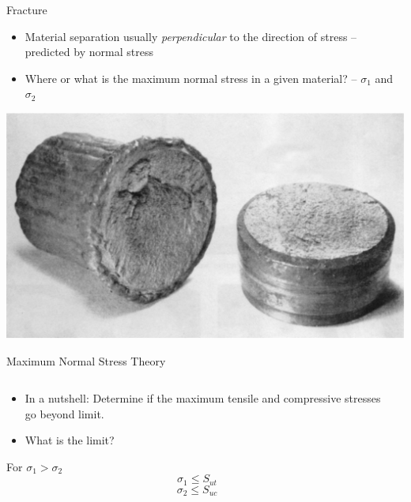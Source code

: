 \documentclass[10pt, svgnames]{beamer}
\begin{document}
\begin{frame}[label={sec:org269d62a}]{Fracture}
\begin{itemize}
\item Material separation usually \emph{perpendicular} to the direction of stress -- predicted by normal stress
\item Where or what is the maximum normal stress in a given material? -- \(\sigma_1\) and \(\sigma_2\)
\end{itemize}

\begin{center}
\includegraphics[width=.9\linewidth]{pictures/brittle-failure.pdf}
\end{center}
\end{frame}

\begin{frame}[label={sec:org373e478}]{Maximum Normal Stress Theory}
\begin{columns}
\begin{column}{0.4\columnwidth}
\begin{itemize}
\item In a nutshell: Determine if the maximum tensile and compressive stresses go beyond limit.
\item What is the limit?
\end{itemize}

For \(\sigma_1 > \sigma_2\)
$$\sigma_1 \leqslant S_{ut} $$
$$\sigma_2 \leqslant S_{uc} $$
\end{column}

\begin{column}{0.6\columnwidth}
\end{column}
\end{columns}
\end{frame}
\end{document}
